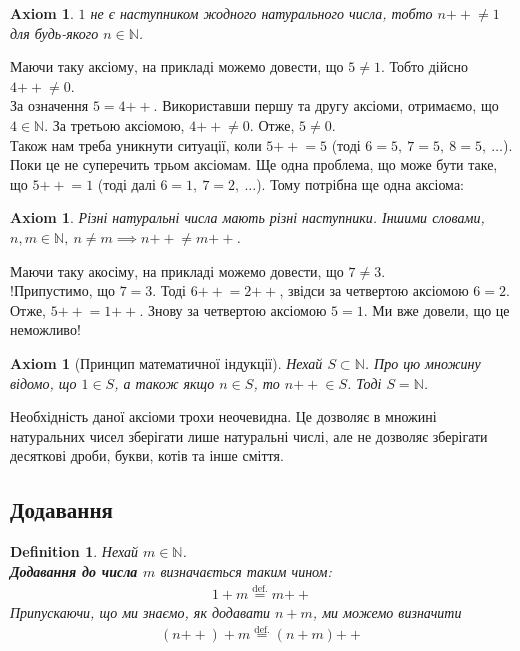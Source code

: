 \documentclass[a4paper, 14pt]{extarticle}
\theoremstyle{theoremdd}
\theoremstyle{theoremdd}
\newtheorem{definition}[theorem]{Definition}
\theoremstyle{theoremdd}
\newtheorem{axiom}[theorem]{Axiom}
\theoremstyle{theoremdd}
\theoremstyle{theoremdd}
\theoremstyle{theoremdd}
\theoremstyle{theoremdd}
\theoremstyle{theoremdd}
\theoremstyle{theoremdd}
\theoremstyle{theoremdd}
\theoremstyle{theoremdd}
\theoremstyle{theoremdd}
\theoremstyle{theoremdd}
\theoremstyle{theoremdd}
\theoremstyle{theoremdd}
\theoremstyle{theoremdd}
\newcommand{\plusplus}{\!\!\mathrel{++}}
\begin{document}
\begin{axiom}
$1$ не є наступником жодного натурального числа, тобто $n \plusplus \neq 1$ для будь-якого $n \in \mathbb{N}$.
\end{axiom}
Маючи таку аксіому, на прикладі можемо довести, що $5 \neq 1$. Тобто дійсно $4\plusplus \neq 0$.\\
За означення $5 = 4\plusplus$. Використавши першу та другу аксіоми, отримаємо, що $4 \in \mathbb{N}$. За третьою аксіомою, $4\plusplus \neq 0$. Отже, $5 \neq 0$.
\bigskip \\
Також нам треба уникнути ситуації, коли $5 \plusplus = 5$ (тоді $6 = 5,\ 7 = 5,\ 8 = 5,\ \dots$). Поки це не суперечить трьом аксіомам. Ще одна проблема, що може бути таке, що $5\plusplus = 1$ (тоді далі $6 = 1,\ 7 = 2,\ \dots$). Тому потрібна ще одна аксіома:

\begin{axiom}
Різні натуральні числа мають різні наступники. Іншими словами, $n,m \in \mathbb{N},\ n \neq m \implies n\plusplus \neq m \plusplus$.
\end{axiom}

Маючи таку акосіму, на прикладі можемо довести, що $7 \neq 3$.\\
!Припустимо, що $7 = 3$. Тоді $6\plusplus = 2\plusplus$, звідси за четвертою аксіомою $6 = 2$. Отже, $5 \plusplus = 1\plusplus$. Знову за четвертою аксіомою $5 = 1$. Ми вже довели, що це неможливо!

\begin{axiom}[Принцип математичної індукції]
Нехай $S \subset \mathbb{N}$. Про цю множину відомо, що $1 \in S$, а також якщо $n \in S$, то $n\plusplus \in S$. Тоді $S = \mathbb{N}$.  
\end{axiom}

Необхідність даної аксіоми трохи неочевидна. Це дозволяє в множині натуральних чисел зберігати лише натуральні числі, але не дозволяє зберігати десяткові дроби, букви, котів та інше сміття.

\subsection{Додавання}
\begin{definition}
Нехай $m \in \mathbb{N}$.\\
\textbf{Додавання до числа $m$} визначається таким чином:
\begin{align*}
1 + m \overset{\text{def.}}{=} m \plusplus
\end{align*}
Припускаючи, що ми знаємо, як додавати $n + m$, ми можемо визначити
\begin{align*}
(n\plusplus) + m \overset{\text{def.}}{=} (n+m)\plusplus
\end{align*}
\end{definition}
\end{document}
